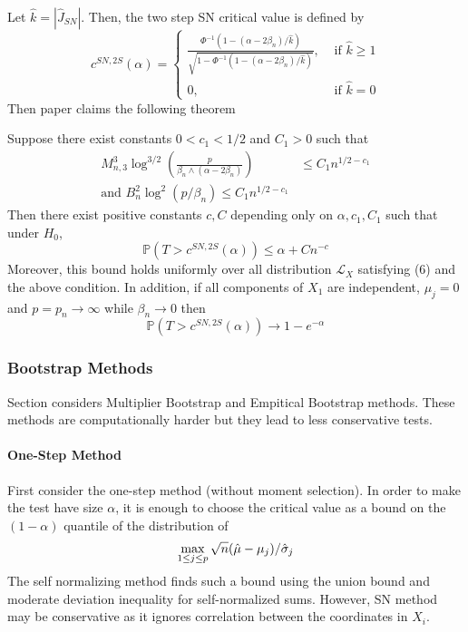 Let $\hat{k} = |\hat{J}_{SN}|$. Then, the two step SN critical value is defined by 
\begin{equation}
	\label{eq:cSN-2S}
	c^{SN, 2S}(\alpha) = \begin{cases} 
	\frac{\Phi^{-1}(1 - (\alpha - 2\beta_n)/\hat{k})}{\sqrt{1 - \Phi^{-1}(1 - (\alpha - 2\beta_n)/\hat{k})}}, & \text{ if }\hat{k} \geq 1 \\
	0, &\text{ if }\hat{k} = 0
	 \end{cases}
\end{equation}
Then paper claims the following theorem 
\begin{theorem}
	\label{thm:2SSN-validity}
	Suppose there exist constants $0 < c_1 < 1/2$ and $C_1 > 0$ such that  
	\begin{align*}
	    	M_{n,3}^3 \log^{3/2}\left(\frac{p}{\beta_n \wedge (\alpha - 2\beta_n)}\right) & \leq C_1 n^{1/2 - c_1} \\ 
	    \text{and }B_n^2\log^2(p/\beta_n) \leq C_1 n^{1/2- c_1}
	\end{align*}
	Then there exist positive constants $c, C$ depending only on $\alpha, c_1, C_1$ such that under $H_0$, 
	\begin{equation}
		\mathbb{P}(T > c^{SN, 2S}(\alpha)) \leq \alpha + Cn^{-c}
	\end{equation}
	Moreover, this bound holds uniformly over all distribution $\mathscr{L}_X$ satisfying (6) and the above condition. In addition, if all components of $X_1$ are independent, $\mu_j = 0$ and $p = p_n \rightarrow \infty$ while $\beta_n \rightarrow 0$ then 
	\[\mathbb{P}(T > c^{SN, 2S}(\alpha)) \rightarrow 1- e^{-\alpha}\]
\end{theorem}

\subsubsection{Bootstrap Methods}

Section considers Multiplier Bootstrap and Empitical Bootstrap methods. These methods are computationally harder but they lead to less conservative tests.

\paragraph{One-Step Method}

First consider the one-step method (without moment selection). In order to make the test have size $\alpha$, it is enough to choose the critical value as a bound on the $(1-\alpha)$ quantile of the distribution of 
\[\max_{1\leq j \leq p} \sqrt{n}(\hat{\mu}-\mu_j)/\hat{\sigma}_j\]
The self normalizing method finds such a bound using the union bound and moderate deviation inequality for self-normalized sums. However, SN method may be conservative as it ignores correlation between the coordinates in $X_i$. 

